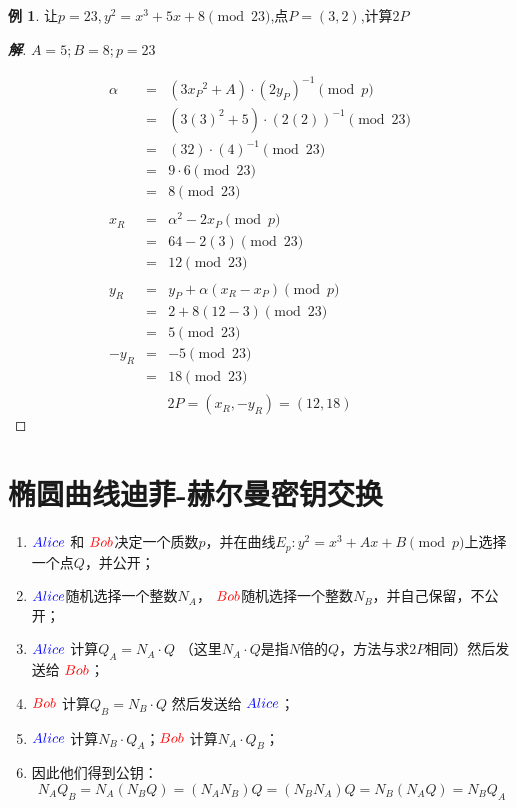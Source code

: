\documentclass{article}
\theoremstyle{definition}
\newtheorem{example}{\indent 例}
\newenvironment{solution}{\begin{proof}[\indent\bf 解]}{\end{proof}}
\begin{document}
\begin{example}
让$p = 23, y^2 = x^3+5x + 8 \pmod{23}$,点$P = (3,2)$,计算$2P$

\begin{solution}
$A = 5;B = 8;p = 23$

\begin{eqnarray}   
\label{eq}
\alpha &=&\left(3{x_P}^2 + A\right) \cdot\left(2y_P\right)^{-1} \pmod{p} \nonumber \\ 
&=& (3(3)^2 + 5)\cdot (2(2))^{-1} \pmod{23} \nonumber \\ 
&=& (32)\cdot (4)^{-1} \pmod{23} \nonumber \\ 
&=& 9 \cdot 6\pmod{23} \nonumber \\ 
&=& 8 \pmod{23} \nonumber \\ 
&& \nonumber \\ 
x_{R} &=& \alpha^{2}-2x_{P}\pmod{p} \nonumber \\ 
&=& 64 - 2(3)\pmod{23} \nonumber \\ 
&=& 12\pmod{23} \nonumber \\ 
&& \nonumber \\ 
y_{R} &=& y_{P}+\alpha\left(x_{R}-x_{P}\right) \pmod{p}\nonumber \\ 
&=& 2 + 8(12-3)\pmod{23} \nonumber \\ 
&=& 5\pmod{23} \nonumber \\ 
- y_{R}&=& -5\pmod{23} \nonumber \\ 
&=& 18\pmod{23} \nonumber \\ 
\nonumber 
\end{eqnarray}
$$2P = (x_{R},-y_{R})=(12,18)$$
\end{solution}
\end{example}

\section{椭圆曲线迪菲-赫尔曼密钥交换}
\begin{enumerate}
\item ${\color{blue}Alice}$ 和 ${\color{red}Bob}$决定一个质数$p$，并在曲线$E_p:y^2 = x^3+Ax+B \pmod{p}$上选择一个点$Q$，并公开；
\item ${\color{blue}Alice}$随机选择一个整数$N_A$， ${\color{red}Bob}$随机选择一个整数$N_B$，并自己保留，不公开；
\item ${\color{blue}Alice}$ 计算$Q_A = N_A \cdot Q$ （这里$N_A \cdot Q$是指$N$倍的$Q$，方法与求$2P$相同）然后发送给 ${\color{red}Bob}$；
\item ${\color{red}Bob}$ 计算$Q_B = N_B \cdot Q$ 然后发送给 ${\color{blue}Alice}$；
\item ${\color{blue}Alice}$ 计算$N_B \cdot Q_A$；${\color{red}Bob}$ 计算$N_A \cdot Q_B$；
\item 因此他们得到公钥：
$$N_AQ_B=N_A(N_BQ)=(N_AN_B)Q=(N_BN_A)Q=N_B(N_AQ)=N_BQ_A$$
\end{enumerate}
\end{document}

